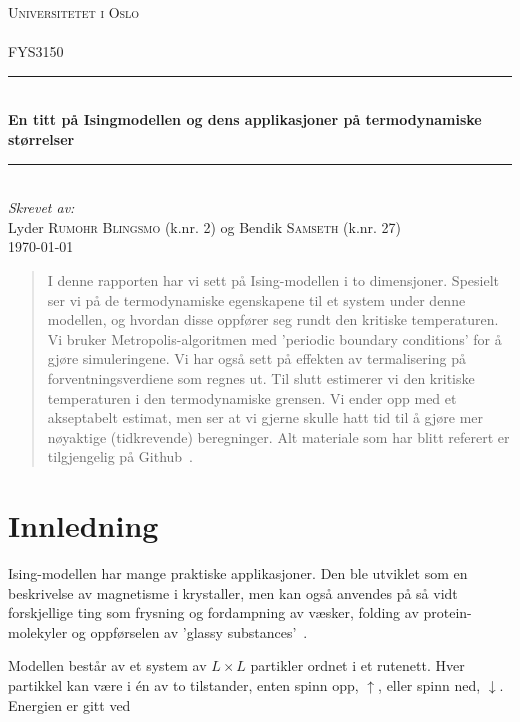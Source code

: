 \documentclass[11pt]{article}
\begin{document}
\begin{titlepage}
  \newcommand{\HRule}{\rule{\linewidth}{0.5mm}}
  \center
  \textsc{\LARGE Universitetet i Oslo}\\[1.5cm] %
  \textsc{\Large }\\[0.5cm] %
  \textsc{\large FYS3150}\\[0.5cm] %
  \HRule \\[0.4cm]
  { \huge \bfseries En titt på Isingmodellen og dens applikasjoner
  på termodynamiske størrelser}\\[0.4cm]
  \HRule \\[1.5cm]
  \Large \emph{Skrevet av:}\\
  Lyder \textsc{Rumohr Blingsmo} (k.nr. 2) og Bendik \textsc{Samseth} (k.nr. 27)\\[3cm]
  {\large \today}\\[3cm]
  \vfill
\end{titlepage}
\tableofcontents
\begin{abstract}
I denne rapporten har vi sett på Ising-modellen i to dimensjoner. Spesielt ser vi
på de termodynamiske egenskapene til et system under denne modellen, og hvordan disse
oppfører seg rundt den kritiske temperaturen. Vi bruker Metropolis-algoritmen med 
'periodic boundary conditions' for å gjøre simuleringene. Vi har også
sett på effekten av termalisering på forventningsverdiene som regnes
ut. Til slutt estimerer vi den kritiske temperaturen i den
termodynamiske grensen. Vi ender opp med et akseptabelt estimat, men
ser at vi gjerne skulle hatt tid til å gjøre mer nøyaktige
(tidkrevende) beregninger. Alt materiale som har blitt referert er tilgjengelig 
på Github~\cite{github-repo}. 
\end{abstract}

\section{Innledning}
\label{sec:innledning}
Ising-modellen har mange praktiske applikasjoner. Den ble utviklet som en
beskrivelse av magnetisme i krystaller, men kan også anvendes på så vidt
forskjellige ting som frysning og fordampning av væsker, folding av 
protein-molekyler og oppførselen av 'glassy substances'~\cite{nature-ising}.

Modellen består av et system av $L \times L$ partikler ordnet i et rutenett. 
Hver partikkel kan være i én av to tilstander, enten spinn opp, $\uparrow$,
eller spinn ned, $\downarrow$. Energien er gitt ved 
\end{document}
